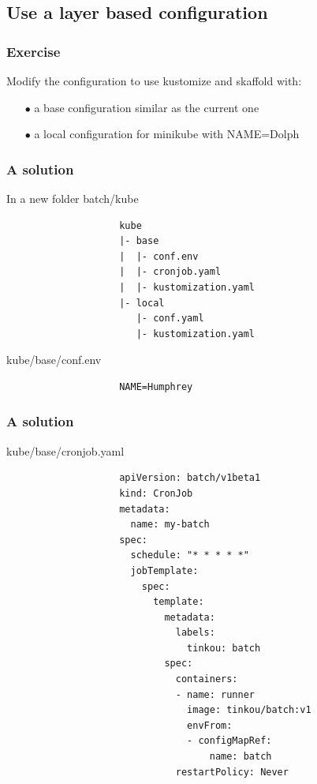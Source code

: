 \subsection{Use a layer based configuration}	
	
	\begin{frame}
		\frametitle{Exercise}
		
		Modify the configuration to use kustomize and skaffold with:
		\begin{itemize}
			\item[$\bullet$] a base configuration similar as the current one
			\item[$\bullet$] a local configuration for minikube with NAME=Dolph
		\end{itemize}
	\end{frame}
	
	\begin{frame}[fragile]
		\frametitle{A solution}
		
		\begin{block}{In a new folder batch/kube}
			\begin{small}
				\begin{verbatim}
					kube
					|- base
					|  |- conf.env
					|  |- cronjob.yaml
					|  |- kustomization.yaml
					|- local
					   |- conf.yaml
					   |- kustomization.yaml
				\end{verbatim}
			\end{small}
		\end{block}

		\begin{block}{kube/base/conf.env}
			\begin{small}
				\begin{verbatim}
					NAME=Humphrey
				\end{verbatim}
			\end{small}
		\end{block}

	\end{frame}
	
	\begin{frame}[fragile]
		\frametitle{A solution}
				
		\begin{block}{kube/base/cronjob.yaml}
			\begin{tiny}
				\begin{verbatim}
					apiVersion: batch/v1beta1
					kind: CronJob
					metadata:
					  name: my-batch
					spec:
					  schedule: "* * * * *"
					  jobTemplate:
					    spec:
					      template:
					        metadata:
					          labels:
					            tinkou: batch
					        spec:
					          containers:
					          - name: runner
					            image: tinkou/batch:v1
					            envFrom:
					            - configMapRef:
					                name: batch
					          restartPolicy: Never
				\end{verbatim}
			\end{tiny}
		\end{block}
	\end{frame}
	
